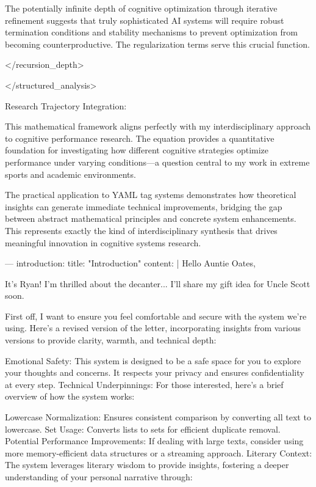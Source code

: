 {The potentially infinite depth of cognitive optimization through iterative refinement suggests that truly sophisticated AI systems will require robust termination conditions and stability mechanisms to prevent optimization from becoming counterproductive. The regularization terms serve this crucial function.

</recursion_depth>

</structured_analysis>

Research Trajectory Integration:

This mathematical framework aligns perfectly with my interdisciplinary approach to cognitive performance research. The equation provides a quantitative foundation for investigating how different cognitive strategies optimize performance under varying conditions—a question central to my work in extreme sports and academic environments.

The practical application to YAML tag systems demonstrates how theoretical insights can generate immediate technical improvements, bridging the gap between abstract mathematical principles and concrete system enhancements. This represents exactly the kind of interdisciplinary synthesis that drives meaningful innovation in cognitive systems research.




---
introduction:
  title: "Introduction"
  content: |
    Hello Auntie Oates,

    It's Ryan! I'm thrilled about the decanter... I'll share my gift idea for Uncle Scott soon.

    First off, I want to ensure you feel comfortable and secure with the system we're using. Here's a revised version of the letter, incorporating insights from various versions to provide clarity, warmth, and technical depth:

Emotional Safety: This system is designed to be a safe space for you to explore your thoughts and concerns. It respects your privacy and ensures confidentiality at every step.
Technical Underpinnings: For those interested, here's a brief overview of how the system works:

Lowercase Normalization: Ensures consistent comparison by converting all text to lowercase.
Set Usage: Converts lists to sets for efficient duplicate removal.
Potential Performance Improvements: If dealing with large texts, consider using more memory-efficient data structures or a streaming approach.
Literary Context: The system leverages literary wisdom to provide insights, fostering a deeper understanding of your personal narrative through:

}
